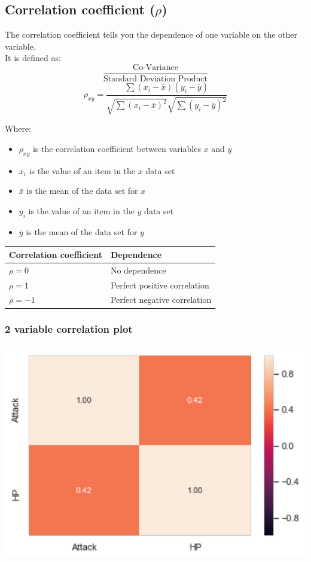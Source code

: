 \documentclass[11pt]{article}
\begin{document}
\subsection{Correlation coefficient (\(\rho\))}
\label{sec:orga1ae082}
The correlation coefficient tells you the dependence of one variable on the other variable.  \\

It is defined as:
\[\frac{\text{Co-Variance}}{\text{Standard Deviation Product}}\]
\[\rho_{xy} = \frac{\sum(x_i - \bar{x}) (y_i - \bar{y})}{\sqrt{\sum (x_i - \bar{x})^2} \sqrt{\sum (y_i - \bar{y})^2}}\]

Where:
\begin{itemize}
\item \(\rho_{xy}\) is the correlation coefficient between variables \(x\) and \(y\)
\item \(x_i\) is the value of an item in the \(x\) data set
\item \(\bar{x}\) is the mean of the data set for \(x\)
\item \(y_i\) is the value of an item in the \(y\) data set
\item \(\bar{y}\) is the mean of the data set for \(y\)
\end{itemize}

\begin{center}
\begin{tabular}{l|l}
Correlation coefficient & Dependence\\
\hline
\(\rho = 0\) & No dependence\\
\(\rho = 1\) & Perfect positive correlation\\
\(\rho = -1\) & Perfect negative correlation\\
\end{tabular}
\end{center}
\subsubsection{2 variable correlation plot}
\label{sec:org2b9fc79}
\begin{center}
\includegraphics[width=.9\linewidth]{./images/2-variable-correlation-plot.png}
\end{center}
\end{document}
